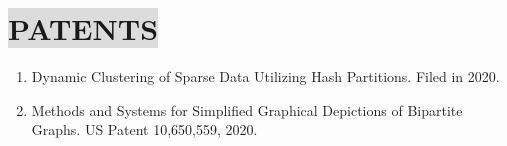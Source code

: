 \section*{
    \colorbox{gainsboro}{PATENTS}  
}

\begin{enumerate}[leftmargin=5mm]
	\item Dynamic Clustering of Sparse Data Utilizing Hash Partitions. Filed in 2020.
    \item Methods and Systems for Simplified Graphical Depictions of Bipartite Graphs. US Patent 10,650,559, 2020.
\end{enumerate}